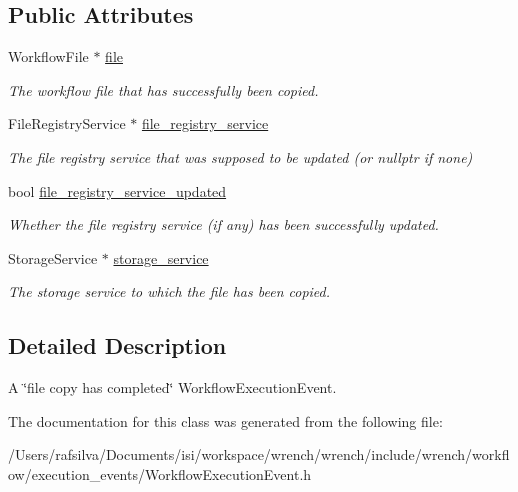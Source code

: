 \subsection*{Public Attributes}
\begin{DoxyCompactItemize}
\item 
\mbox{\label{class_file_copy_completed_event_a5e51b08e77c46e2d9c764f36ceb643a1}} 
Workflow\+File $\ast$ \hyperlink{class_file_copy_completed_event_a5e51b08e77c46e2d9c764f36ceb643a1}{file}
\begin{DoxyCompactList}\small\item\em The workflow file that has successfully been copied. \end{DoxyCompactList}\item 
\mbox{\label{class_file_copy_completed_event_a6f8c93c51d18ecb3a033bd5cdf1e4b44}} 
File\+Registry\+Service $\ast$ \hyperlink{class_file_copy_completed_event_a6f8c93c51d18ecb3a033bd5cdf1e4b44}{file\+\_\+registry\+\_\+service}
\begin{DoxyCompactList}\small\item\em The file registry service that was supposed to be updated (or nullptr if none) \end{DoxyCompactList}\item 
\mbox{\label{class_file_copy_completed_event_a1a50aed6c29d0db6af87596280ab9af3}} 
bool \hyperlink{class_file_copy_completed_event_a1a50aed6c29d0db6af87596280ab9af3}{file\+\_\+registry\+\_\+service\+\_\+updated}
\begin{DoxyCompactList}\small\item\em Whether the file registry service (if any) has been successfully updated. \end{DoxyCompactList}\item 
\mbox{\label{class_file_copy_completed_event_a3a09156d86abde5c6fbfce7be0512d70}} 
Storage\+Service $\ast$ \hyperlink{class_file_copy_completed_event_a3a09156d86abde5c6fbfce7be0512d70}{storage\+\_\+service}
\begin{DoxyCompactList}\small\item\em The storage service to which the file has been copied. \end{DoxyCompactList}\end{DoxyCompactItemize}


\subsection{Detailed Description}
A \char`\"{}file copy has completed\char`\"{} Workflow\+Execution\+Event. 

The documentation for this class was generated from the following file\+:\begin{DoxyCompactItemize}
\item 
/\+Users/rafsilva/\+Documents/isi/workspace/wrench/wrench/include/wrench/workflow/execution\+\_\+events/Workflow\+Execution\+Event.\+h\end{DoxyCompactItemize}
